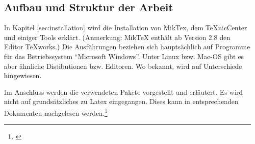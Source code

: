 \subsection{Aufbau und Struktur der Arbeit}

In Kapitel \cref{sec:installation} wird die Installation von MikTex, dem TeXnicCenter und einiger Tools erklärt. (Anmerkung: MikTeX enthält ab Version 2.8 den Editor TeXworks.) Die Ausführungen beziehen sich hauptsächlich auf Programme für das Betriebssystem ``Microsoft Windows''. Unter Linux bzw. Mac-OS gibt es aber ähnliche Distibutionen bzw. Editoren. Wo bekannt, wird auf Unterschiede hingewiesen.

Im Anschluss werden die verwendeten Pakete vorgestellt und erläutert. Es wird nicht auf grundsätzliches zu Latex eingegangen. Dises kann in entsprechenden Dokumenten nachgelesen werden.\footnote{\cite[siehe][]{einf:latex,fort:latex}}